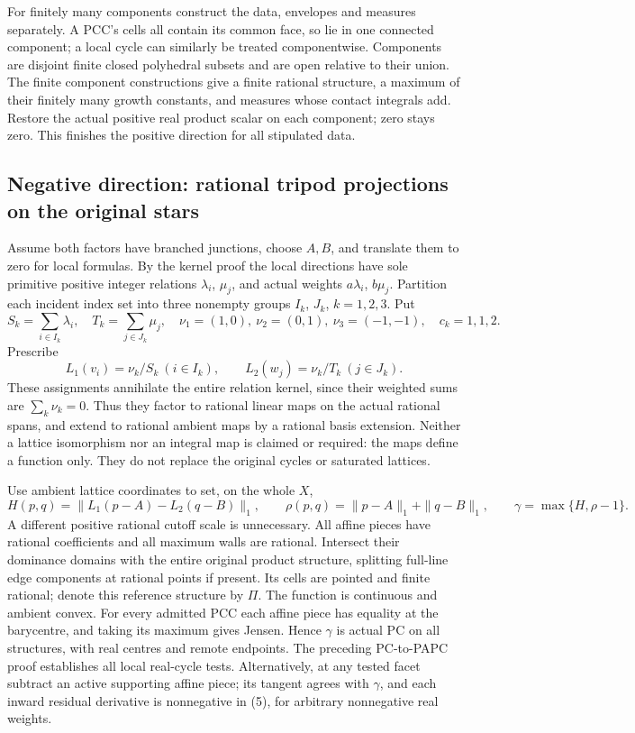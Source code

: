 \documentclass[
  11pt,
]{article}
\begin{document}
For finitely many components construct the data, envelopes and measures
separately. A PCC's cells all contain its common face, so lie in one
connected component; a local cycle can similarly be treated
componentwise. Components are disjoint finite closed polyhedral subsets
and are open relative to their union. The finite component constructions
give a finite rational structure, a maximum of their finitely many
growth constants, and measures whose contact integrals add. Restore the
actual positive real product scalar on each component; zero stays zero.
This finishes the positive direction for all stipulated data.

\subsection{Negative direction: rational tripod projections on the
original
stars}\label{negative-direction-rational-tripod-projections-on-the-original-stars}

Assume both factors have branched junctions, choose \(A,B\), and
translate them to zero for local formulas. By the kernel proof the local
directions have sole primitive positive integer relations \(\lambda_i\),
\(\mu_j\), and actual weights \(a\lambda_i\), \(b\mu_j\). Partition each
incident index set into three nonempty groups \(I_k\), \(J_k\),
\(k=1,2,3\). Put \[
 S_k=\sum_{i\in I_k}\lambda_i,\quad T_k=\sum_{j\in J_k}\mu_j,
 \quad\nu_1=(1,0),\ \nu_2=(0,1),\ \nu_3=(-1,-1),\quad c_k=1,1,2.
\] Prescribe \[
 L_1(v_i)=\nu_k/S_k\ (i\in I_k),\qquad
 L_2(w_j)=\nu_k/T_k\ (j\in J_k).                            \tag{28}
\] These assignments annihilate the entire relation kernel, since their
weighted sums are \(\sum_k\nu_k=0\). Thus they factor to rational linear
maps on the actual rational spans, and extend to rational ambient maps
by a rational basis extension. Neither a lattice isomorphism nor an
integral map is claimed or required: the maps define a function only.
They do not replace the original cycles or saturated lattices.

Use ambient lattice coordinates to set, on the whole \(X\), \[
 H(p,q)=\|L_1(p-A)-L_2(q-B)\|_1,\qquad
 \rho(p,q)=\|p-A\|_1+\|q-B\|_1,
 \qquad\gamma=\max\{H,\rho-1\}.                            \tag{29}
\] A different positive rational cutoff scale is unnecessary. All affine
pieces have rational coefficients and all maximum walls are rational.
Intersect their dominance domains with the entire original product
structure, splitting full-line edge components at rational points if
present. Its cells are pointed and finite rational; denote this
reference structure by \(\Pi\). The function is continuous and ambient
convex. For every admitted PCC each affine piece has equality at the
barycentre, and taking its maximum gives Jensen. Hence \(\gamma\) is
actual PC on all structures, with real centres and remote endpoints. The
preceding PC-to-PAPC proof establishes all local real-cycle tests.
Alternatively, at any tested facet subtract an active supporting affine
piece; its tangent agrees with \(\gamma\), and each inward residual
derivative is nonnegative in (5), for arbitrary nonnegative real
weights.
\end{document}

